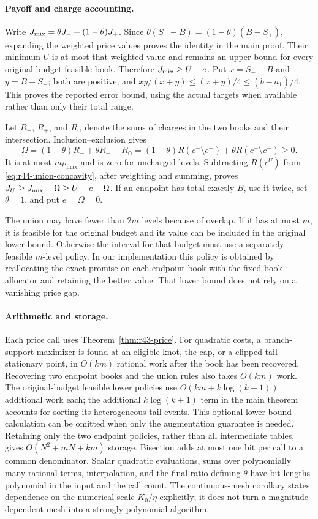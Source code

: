 \paragraph{Payoff and charge accounting.}
Write $J_{\rm mix}=\theta J_-+(1-\theta)J_+$. Since
$\theta(S_--B)=(1-\theta)(B-S_+)$, expanding the weighted price values proves the identity in the main proof. Their minimum $U$ is at most that weighted value and remains an upper bound for every original-budget feasible book. Therefore $J_{\rm mix}\geq U-e$. Put $x=S_--B$ and $y=B-S_+$; both are positive, and $xy/(x+y)\leq(x+y)/4\leq(\bar b-a_1)/4$. This proves the reported error bound, using the actual targets when available rather than only their total range.

Let $R_-$, $R_+$, and $R_\cap$ denote the sums of charges in the two books and their intersection. Inclusion--exclusion gives
\[
 \Omega=(1-\theta)R_-+\theta R_+-R_\cap
 =(1-\theta)R(c^-\setminus c^+)+\theta R(c^+\setminus c^-)\geq0.
\]
It is at most $m\rho_{\max}$ and is zero for uncharged levels. Subtracting $R(c^U)$ from \eqref{eq:r44-union-concavity}, after weighting and summing, proves $J_U\geq J_{\rm mix}-\Omega\geq U-e-\Omega$. If an endpoint has total exactly $B$, use it twice, set $\theta=1$, and put $e=\Omega=0$.

The union may have fewer than $2m$ levels because of overlap. If it has at most $m$, it is feasible for the original budget and its value can be included in the original lower bound. Otherwise the interval for that budget must use a separately feasible $m$-level policy. In our implementation this policy is obtained by reallocating the exact promise on each endpoint book with the fixed-book allocator and retaining the better value. That lower bound does not rely on a vanishing price gap.

\paragraph{Arithmetic and storage.}
Each price call uses Theorem~\ref{thm:r43-price}. For quadratic costs, a branch-support maximizer is found at an eligible knot, the cap, or a clipped tail stationary point, in $O(km)$ rational work after the book has been recovered. Recovering two endpoint books and the union rules also takes $O(km)$ work. The original-budget feasible lower policies use $O(km+k\log(k+1))$ additional work each; the additional $k\log(k+1)$ term in the main theorem accounts for sorting its heterogeneous tail events. This optional lower-bound calculation can be omitted when only the augmentation guarantee is needed. Retaining only the two endpoint policies, rather than all intermediate tables, gives $O(N^2+mN+km)$ storage. Bisection adds at most one bit per call to a common denominator. Scalar quadratic evaluations, sums over polynomially many rational terms, interpolation, and the final ratio defining $\theta$ have bit lengths polynomial in the input and the call count. The continuous-mesh corollary states dependence on the numerical scale $K_0/\eta$ explicitly; it does not turn a magnitude-dependent mesh into a strongly polynomial algorithm.

